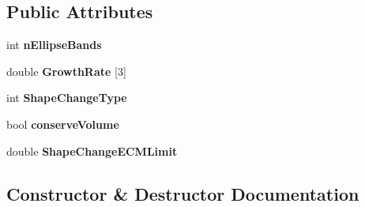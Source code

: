 \subsection*{Public Attributes}
\begin{DoxyCompactItemize}
\item 
\hypertarget{classmarkerEllipseBasedShapeChangeFunction_ad3a4295d10decba7cfedcfc346be4267}{}int {\bfseries n\+Ellipse\+Bands}\label{classmarkerEllipseBasedShapeChangeFunction_ad3a4295d10decba7cfedcfc346be4267}

\item 
\hypertarget{classmarkerEllipseBasedShapeChangeFunction_af629b3243c3e8042fc63da026f643f0b}{}double {\bfseries Growth\+Rate} \mbox{[}3\mbox{]}\label{classmarkerEllipseBasedShapeChangeFunction_af629b3243c3e8042fc63da026f643f0b}

\item 
\hypertarget{classmarkerEllipseBasedShapeChangeFunction_a0ddbc19f190dae22e370d26142d31472}{}int {\bfseries Shape\+Change\+Type}\label{classmarkerEllipseBasedShapeChangeFunction_a0ddbc19f190dae22e370d26142d31472}

\item 
\hypertarget{classmarkerEllipseBasedShapeChangeFunction_a3de1358ce2f62a683585fd9662672744}{}bool {\bfseries conserve\+Volume}\label{classmarkerEllipseBasedShapeChangeFunction_a3de1358ce2f62a683585fd9662672744}

\item 
\hypertarget{classmarkerEllipseBasedShapeChangeFunction_a95dbc4a53d1c4ddd4f896df7dc09525c}{}double {\bfseries Shape\+Change\+E\+C\+M\+Limit}\label{classmarkerEllipseBasedShapeChangeFunction_a95dbc4a53d1c4ddd4f896df7dc09525c}

\end{DoxyCompactItemize}


\subsection{Constructor \& Destructor Documentation}
\hypertarget{classmarkerEllipseBasedShapeChangeFunction_a194f0e273b24c79645705daa589b0960}{}
